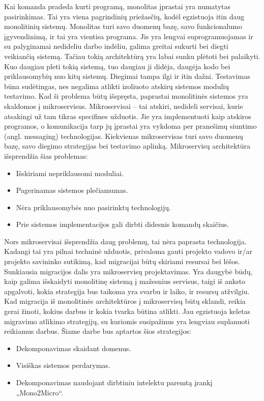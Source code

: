 \documentclass[fleqn]{VUMIFPSkursinis}
\begin{document}
Kai komanda pradeda kurti programą, monolitas įprastai yra numatytas pasirinkimas. Tai yra viena pagrindinių priežasčių, kodėl egzistuoja itin daug monolitinių sistemų. Monolitas turi savo duomenų bazę, savo funkcionalumo įgyvendinimą, ir tai yra vientisa programa. Jis yra lengvai suprogramuojamas ir su palyginamai nedideliu darbo indėliu, galima greitai sukurti bei diegti veikiančią sistemą. Tačiau tokią architektūrą yra labai sunku plėtoti bei palaikyti. Kuo daugiau pleti tokią sistemą, tuo daugiau ji didėja, daugėja kodo bei priklausomybių nuo kitų sistemų. Diegimai tampa ilgi ir itin dažni. Testavimas būna sudėtingas, nes negalima atlikti izoliuoto atskirų sistemos modulių testavimo. Kad ši problema būtų išspręsta, paprastai monolitinės sistemos yra skaldomos į mikroservisus. 
Mikroservisai – tai atskiri, nedideli servisai, kurie atsakingi už tam tikras specifines užduotis. Jie yra implementuoti kaip atskiros programos, o komunikacija tarp jų įprastai yra vykdoma per pranešimų siuntimo (angl. messaging) technologijas. Kiekvienas mikroservisas turi savo duomenų bazę, savo diegimo strategijas bei testavimo aplinką. Mikroservisų architektūra išsprendžia šias problemas:
\begin{itemize}
    \item Išskiriami nepriklausomi moduliai.
    \item Pagerinamas sistemos plečiamumas.
    \item Nėra priklausomybės nuo pasirinktų technologijų.
    \item Prie sistemos implementacijos gali dirbti didesnis komandų skaičius.
\end{itemize}

Nors mikroservisai išsprendžia daug problemų, tai nėra paprasta technologija. Kadangi tai yra pilnai techninė užduotis, privaloma gauti projekto vadovo ir/ar projekto savininko sutikimą, kad migracijai būtų skiriami resursai bei lėšos. Sunkiausia migracijos dalis yra mikroservisų projektavimas. Yra daugybė būdų, kaip galima išskaidyti monolitinę sistemą į mažesnius servisus, taigi iš anksto apgalvoti, kokia strategija bus taikoma yra svarbu ir laiko, ir resursų atžvilgiu. Kad migracija iš monolitinės architektūros į mikroservisų būtų sklandi, reikia gerai žinoti, kokius darbus ir kokia tvarka būtina atlikti. Jau egzistuoja keletas migravimo atlikimo strategijų, su kuriomis susipažinus yra lengviau suplanuoti reikiamus darbus. Šiame darbe bus aptartos šios strategijos:
\begin{itemize}
    \item Dekomponavimas skaidant domenus.
    \item Visiškas sistemos perdarymas.
    \item Dekomponavimas naudojant dirbtiniu intelektu paremtą įrankį „Mono2Micro“.
\end{itemize}
\end{document}
